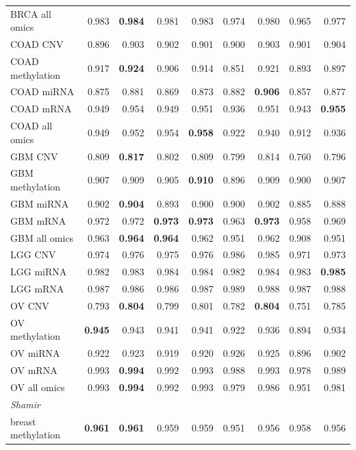 \begin{tabular}{lrrrrrrrr}
BRCA all omics & 0.983 & \textbf{0.984} & 0.981 & 0.983 & 0.974 & 0.980 & 0.965 & 0.977 \\
COAD CNV & 0.896 & 0.903 & 0.902 & 0.901 & 0.900 & 0.903 & 0.901 & 0.904 \\
COAD methylation & 0.917 & \textbf{0.924} & 0.906 & 0.914 & 0.851 & 0.921 & 0.893 & 0.897 \\
COAD miRNA & 0.875 & 0.881 & 0.869 & 0.873 & 0.882 & \textbf{0.906} & 0.857 & 0.877 \\
COAD mRNA & 0.949 & 0.954 & 0.949 & 0.951 & 0.936 & 0.951 & 0.943 & \textbf{0.955} \\
COAD all omics & 0.949 & 0.952 & 0.954 & \textbf{0.958} & 0.922 & 0.940 & 0.912 & 0.936 \\
GBM CNV & 0.809 & \textbf{0.817} & 0.802 & 0.809 & 0.799 & 0.814 & 0.760 & 0.796 \\
GBM methylation & 0.907 & 0.909 & 0.905 & \textbf{0.910} & 0.896 & 0.909 & 0.900 & 0.907 \\
GBM miRNA & 0.902 & \textbf{0.904} & 0.893 & 0.900 & 0.900 & 0.902 & 0.885 & 0.888 \\
GBM mRNA & 0.972 & 0.972 & \textbf{0.973} & \textbf{0.973} & 0.963 & \textbf{0.973} & 0.958 & 0.969 \\
GBM all omics & 0.963 & \textbf{0.964} & \textbf{0.964} & 0.962 & 0.951 & 0.962 & 0.908 & 0.951 \\
LGG CNV & 0.974 & 0.976 & 0.975 & 0.976 & 0.986 & 0.985 & 0.971 & 0.973 \\
LGG miRNA & 0.982 & 0.983 & 0.984 & 0.984 & 0.982 & 0.984 & 0.983 & \textbf{0.985} \\
LGG mRNA & 0.987 & 0.986 & 0.986 & 0.987 & 0.989 & 0.988 & 0.987 & 0.988 \\
OV CNV & 0.793 & \textbf{0.804} & 0.799 & 0.801 & 0.782 & \textbf{0.804} & 0.751 & 0.785 \\
OV methylation & \textbf{0.945} & 0.943 & 0.941 & 0.941 & 0.922 & 0.936 & 0.894 & 0.934 \\
OV miRNA & 0.922 & 0.923 & 0.919 & 0.920 & 0.926 & 0.925 & 0.896 & 0.902 \\
OV mRNA & 0.993 & \textbf{0.994} & 0.992 & 0.993 & 0.988 & 0.993 & 0.978 & 0.989 \\
OV all omics & 0.993 & \textbf{0.994} & 0.992 & 0.993 & 0.979 & 0.986 & 0.951 & 0.981 \\
\midrule \multicolumn{9}{l}{\emph{Shamir}} \\
breast methylation & \textbf{0.961} & \textbf{0.961} & 0.959 & 0.959 & 0.951 & 0.956 & 0.958 & 0.956 \\

\end{tabular}
